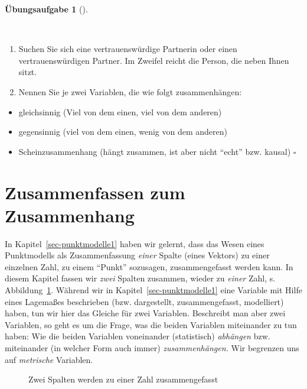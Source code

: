 \documentclass[
  letterpaper,
  twoside,
  open=any]{scrbook}
\providecommand{\tightlist}{%
  \setlength{\itemsep}{0pt}\setlength{\parskip}{0pt}}\usepackage{longtable,booktabs,array}
\theoremstyle{definition}
\theoremstyle{definition}
\newtheorem{exercise}{Übungsaufgabe}[chapter]
\theoremstyle{definition}
\theoremstyle{remark}
\begin{document}
\begin{exercise}[]\protect\hypertarget{exr-zsgh-studis}{}\label{exr-zsgh-studis}

~

\begin{enumerate}
\def\labelenumi{\arabic{enumi}.}
\tightlist
\item
  Suchen Sie sich eine vertrauenswürdige Partnerin oder einen
  vertrauenswürdigen Partner. Im Zweifel reicht die Person, die neben
  Ihnen sitzt.
\item
  Nennen Sie je zwei Variablen, die wie folgt zusammenhängen:
\end{enumerate}

\begin{itemize}
\tightlist
\item
  gleichsinnig (Viel von dem einen, viel von dem anderen)
\item
  gegensinnig (viel von dem einen, wenig von dem anderen)
\item
  Scheinzusammenhang (hängt zusammen, ist aber nicht \enquote{echt} bzw.
  kausal) \(\square\)
\end{itemize}

\end{exercise}

\section{Zusammenfassen zum
Zusammenhang}\label{zusammenfassen-zum-zusammenhang}

In Kapitel~\ref{sec-punktmodelle1} haben wir gelernt, dass das Wesen
eines Punktmodells als Zusammenfassung \emph{einer} Spalte (eines
Vektors) zu einer einzelnen Zahl, zu einem \enquote{Punkt} sozusagen,
zusammengefasst werden kann. In diesem Kapitel fassen wir \emph{zwei}
Spalten zusammen, wieder zu \emph{einer} Zahl, s.
Abbildung~\ref{fig-desk2}. Während wir in
Kapitel~\ref{sec-punktmodelle1} eine Variable mit Hilfe eines Lagemaßes
beschrieben (bzw. dargestellt, zusammengefasst, modelliert) haben, tun
wir hier das Gleiche für zwei Variablen. Beschreibt man aber zwei
Variablen, so geht es um die Frage, was die beiden Variablen miteinander
zu tun haben: Wie die beiden Variablen voneinander (statistisch)
\emph{abhängen} bzw. miteinander (in welcher Form auch immer)
\emph{zusammenhängen.} Wir begrenzen uns auf \emph{metrische} Variablen.

\begin{figure}


\caption{\label{fig-desk2}Zwei Spalten werden zu einer Zahl
zusammengefasst}

\end{figure}%
\end{document}
